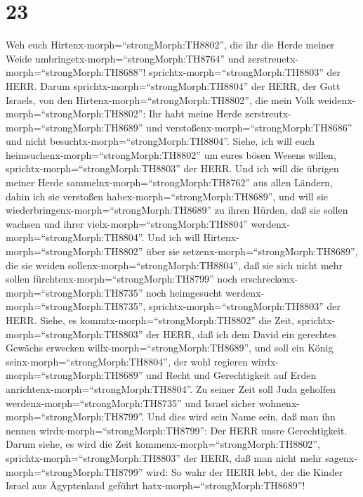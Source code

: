 \hypertarget{section-22}{%
\section{23}\label{section-22}}

 Weh euch Hirtenx-morph=``strongMorph:TH8802'', die ihr die
Herde meiner Weide umbringetx-morph=``strongMorph:TH8764'' und
zerstreuetx-morph=``strongMorph:TH8688''!
sprichtx-morph=``strongMorph:TH8803'' der HERR.  Darum
sprichtx-morph=``strongMorph:TH8804'' der HERR, der Gott Israels, von
den Hirtenx-morph=``strongMorph:TH8802'', die mein Volk
weidenx-morph=``strongMorph:TH8802'': Ihr habt meine Herde
zerstreutx-morph=``strongMorph:TH8689'' und
verstoßenx-morph=``strongMorph:TH8686'' und nicht
besuchtx-morph=``strongMorph:TH8804''. Siehe, ich will euch
heimsuchenx-morph=``strongMorph:TH8802'' um eures bösen Wesens willen,
sprichtx-morph=``strongMorph:TH8803'' der HERR.  Und ich
will die übrigen meiner Herde sammelnx-morph=``strongMorph:TH8762'' aus
allen Ländern, dahin ich sie verstoßen
habex-morph=``strongMorph:TH8689'', und will sie
wiederbringenx-morph=``strongMorph:TH8689'' zu ihren Hürden, daß sie
sollen wachsen und ihrer vielx-morph=``strongMorph:TH8804''
werdenx-morph=``strongMorph:TH8804''.  Und ich will
Hirtenx-morph=``strongMorph:TH8802'' über sie
setzenx-morph=``strongMorph:TH8689'', die sie weiden
sollenx-morph=``strongMorph:TH8804'', daß sie sich nicht mehr sollen
fürchtenx-morph=``strongMorph:TH8799'' noch
erschreckenx-morph=``strongMorph:TH8735'' noch heimgesucht
werdenx-morph=``strongMorph:TH8735'',
sprichtx-morph=``strongMorph:TH8803'' der HERR.  Siehe, es
kommtx-morph=``strongMorph:TH8802'' die Zeit,
sprichtx-morph=``strongMorph:TH8803'' der HERR, daß ich dem David ein
gerechtes Gewächs erwecken willx-morph=``strongMorph:TH8689'', und soll
ein König seinx-morph=``strongMorph:TH8804'', der wohl regieren
wirdx-morph=``strongMorph:TH8689'' und Recht und Gerechtigkeit auf Erden
anrichtenx-morph=``strongMorph:TH8804''.  Zu seiner Zeit
soll Juda geholfen werdenx-morph=``strongMorph:TH8735'' und Israel
sicher wohnenx-morph=``strongMorph:TH8799''. Und dies wird sein Name
sein, daß man ihn nennen wirdx-morph=``strongMorph:TH8799'': Der HERR
unsre Gerechtigkeit.  Darum siehe, es wird die Zeit
kommenx-morph=``strongMorph:TH8802'',
sprichtx-morph=``strongMorph:TH8803'' der HERR, daß man nicht mehr
sagenx-morph=``strongMorph:TH8799'' wird: So wahr der HERR lebt, der die
Kinder Israel aus Ägyptenland geführt hatx-morph=``strongMorph:TH8689''!
